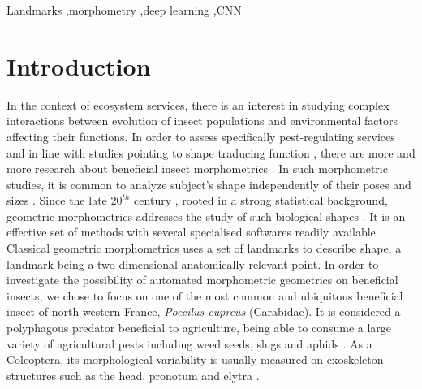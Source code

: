 \documentclass[review]{elsarticle}
\begin{document}
\begin{frontmatter}
\begin{keyword}
Landmarks \sep morphometry \sep deep learning \sep CNN
\end{keyword}

\end{frontmatter}

\linenumbers

\section{Introduction}

In the context of ecosystem services, there is an interest in studying complex interactions between evolution of insect populations and environmental factors affecting their functions. In order to assess specifically pest-regulating services and in line with studies pointing to shape traducing function \cite{klingenberg_evolution_2010}, there are more and more research about beneficial insect morphometrics \cite{sasakawa_utility_2016,raymond_combination_2014}. 
 In such morphometric studies, it is common to analyze subject's shape independently of their poses and sizes \cite{kendall_diffusion_1977}. Since the late $20^{th}$ century \cite{bookstein_foundations_1982}, rooted in a strong statistical background, geometric morphometrics addresses the study of such biological shapes \cite{rohlf_applications_1998}. It is an effective set of methods with several specialised softwares readily available \cite{adams_geomorph:_2013,klingenberg_morphoj:_2011}. Classical geometric morphometrics uses a set of landmarks to describe shape, a landmark being a two-dimensional anatomically-relevant point. In order to investigate the possibility of automated morphometric geometrics on beneficial insects, we chose to focus on one of the most common and ubiquitous beneficial insect of north-western France, \textit{Poecilus cupreus} (Carabidae). It is considered a polyphagous predator \cite{larochelle_1990} beneficial to agriculture, being able to consume a large variety of agricultural pests including weed seeds, slugs and aphids \cite{kromp_carabid_1999}. As a Coleoptera, its morphological variability is usually measured on exoskeleton structures such as the head, pronotum and elytra \cite{eldred_does_2016}. 
 
\end{document}
